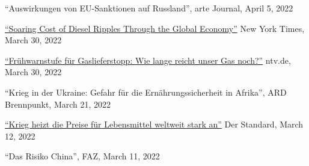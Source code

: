 \documentclass{article}
\newlength{\cvlabelwidth}\setlength{\cvlabelwidth}{0.12\textwidth}
\newlength{\cvlabelgap}\setlength{\cvlabelgap}{5mm}
\newcommand{\cvmakelabel}[1]{%
    \smash{\parbox[t]{\cvlabelwidth}{\raggedright{\fontfamily{phv}\selectfont #1}}}}
\newenvironment{cvsection}[1]{%
    \par\medskip
    \begin{list}{}{%
        \setlength{\leftmargin}{\dimexpr\cvlabelwidth+\cvlabelgap\relax}%
        \setlength{\labelwidth}{\cvlabelwidth}%
        \setlength{\labelsep}{\cvlabelgap}%
        \setlength{\rightmargin}{0pt}%
        \setlength{\itemindent}{0pt}%
        \setlength{\listparindent}{0pt}%
        \setlength{\topsep}{0pt}%
        \setlength{\partopsep}{0pt}%
        \setlength{\parsep}{0.3em}%
        \setlength{\itemsep}{0pt}%
        \let\makelabel\cvmakelabel%
    }%
    \item[#1]\ignorespaces%
}{%
    \end{list}\medskip%
}
\begin{document}
\begin{cvsection}{SELECTED MEDIA APPEARANCE}
    ``Auswirkungen von EU-Sanktionen auf Russland'', arte Journal, April 5, 2022 \par
        \href{https://www.nytimes.com/2022/03/31/business/economy/diesel-economy-russia-ukraine.html}{``Soaring Cost of Diesel Ripples Through the Global Economy''} New York Times, March 30, 2022 \par
    \href{https://www.n-tv.de/wirtschaft/Wie-lange-reicht-unser-Gas-noch-article23234226.html}{``Frühwarnstufe für Gaslieferstopp: Wie lange reicht unser Gas noch?''} ntv.de, March 30, 2022 \par
    ``Krieg in der Ukraine: Gefahr für die Ernährungssicherheit in Afrika'', ARD Brennpunkt, March 21, 2022 \par
    \href{https://www.derstandard.de/story/2000134038874/krieg-heizt-die-preise-fuer-lebensmittel-weltweit-stark-an}{``Krieg heizt die Preise für Lebensmittel weltweit stark an''} Der Standard, March 12, 2022 \par
    ``Das Risiko China'', FAZ, March 11, 2022 \par


\end{cvsection}
\end{document}
